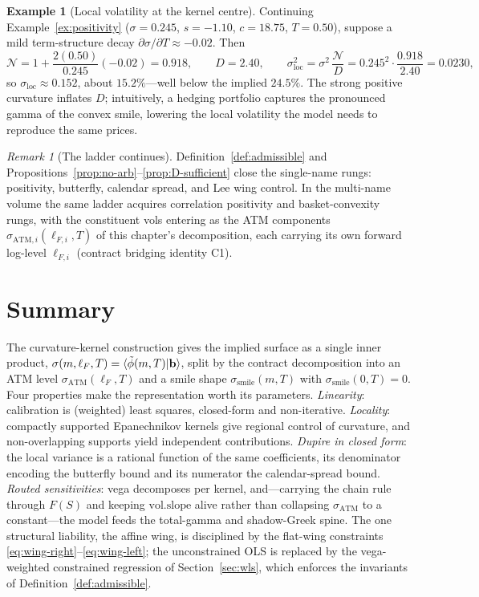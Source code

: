 \documentclass[11pt]{book}
\theoremstyle{plain}
\theoremstyle{definition}
\newtheorem{example}[theorem]{Example}
\theoremstyle{remark}
\newtheorem{remark}[theorem]{Remark}
\newcommand{\braket}[1]{\mathinner{\langle #1 \rangle}}
\newcommand{\mln}{m}                             %
\newcommand{\lF}{\ell_F}                         %
\newcommand{\ssm}{\sigma_{\mathrm{smile}}}       %
\newcommand{\satm}{\sigma_{\mathrm{ATM}}}        %
\newcommand{\satmi}[1]{\sigma_{\mathrm{ATM},#1}} %
\newcommand{\lFi}[1]{\ell_{F,#1}}                %
\newcommand{\volslope}{\mathrm{vol.slope}}       %
\newcommand{\sloc}{\sigma_{\mathrm{loc}}}        %
\begin{document}
\begin{example}[Local volatility at the kernel centre]\label{ex:localvol}
Continuing Example~\ref{ex:positivity} ($\sigma = 0.245$, $s = -1.10$,
$c = 18.75$, $T = 0.50$), suppose a mild term-structure decay
$\partial\sigma/\partial T \approx -0.02$. Then
\[
\mathcal N = 1 + \frac{2(0.50)}{0.245}(-0.02) = 0.918,
\qquad
D = 2.40,
\qquad
\sloc^2 = \sigma^2\,\frac{\mathcal N}{D}
= 0.245^2\cdot\frac{0.918}{2.40} = 0.0230,
\]
so $\sloc \approx 0.152$, about $15.2\%$---well below the implied $24.5\%$. The
strong positive curvature inflates $D$; intuitively, a hedging portfolio
captures the pronounced gamma of the convex smile, lowering the local
volatility the model needs to reproduce the same prices.
\end{example}

\begin{remark}[The ladder continues]\label{rem:ladder-forward}
Definition~\ref{def:admissible} and Propositions~\ref{prop:no-arb}--\ref{prop:D-sufficient}
close the single-name rungs: positivity, butterfly, calendar spread, and Lee
wing control. In the multi-name volume the same ladder acquires correlation
positivity and basket-convexity rungs, with the constituent vols entering as
the ATM components $\satmi{i}(\lFi{i},T)$ of this chapter's decomposition, each
carrying its own forward log-level $\lFi{i}$ (contract bridging identity C1).
\end{remark}

\section{Summary}
\label{sec:summary}

The curvature-kernel construction gives the implied surface as a single inner
product, $\sigma(\mln,\lF,T) = \braket{\tilde\phi(\mln,T)|\mathbf b}$, split by
the contract decomposition into an ATM level $\satm(\lF,T)$ and a smile shape
$\ssm(\mln,T)$ with $\ssm(0,T)=0$. Four properties make the representation
worth its parameters. \emph{Linearity}: calibration is (weighted) least
squares, closed-form and non-iterative. \emph{Locality}: compactly supported
Epanechnikov kernels give regional control of curvature, and non-overlapping
supports yield independent contributions. \emph{Dupire in closed form}: the
local variance is a rational function of the same coefficients, its denominator
encoding the butterfly bound and its numerator the calendar-spread bound.
\emph{Routed sensitivities}: vega decomposes per kernel, and---carrying the
chain rule through $F(S)$ and keeping $\volslope$ alive rather than collapsing
$\satm$ to a constant---the model feeds the total-gamma and shadow-Greek spine.
The one structural liability, the affine wing, is disciplined by the flat-wing
constraints \eqref{eq:wing-right}--\eqref{eq:wing-left}; the unconstrained OLS
is replaced by the vega-weighted constrained regression of
Section~\ref{sec:wls}, which enforces the invariants of
Definition~\ref{def:admissible}.
\end{document}
